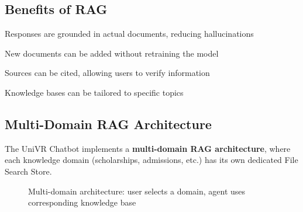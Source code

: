 \documentclass[12pt,a4paper]{article}
\begin{document}
\subsection{Benefits of RAG}

\begin{tcolorbox}[colback=univrbg, colframe=darkblue]
    \begin{description}[style=nextline]
        \item[Accuracy] Responses are grounded in actual documents, reducing hallucinations
        \item[Up-to-date Information] New documents can be added without retraining the model
        \item[Transparency] Sources can be cited, allowing users to verify information
        \item[Domain Specificity] Knowledge bases can be tailored to specific topics
    \end{description}
\end{tcolorbox}

\subsection{Multi-Domain RAG Architecture}

The UniVR Chatbot implements a \textbf{multi-domain RAG architecture}, where each knowledge domain (scholarships, admissions, etc.) has its own dedicated File Search Store.

\begin{figure}[H]
    \centering
    \caption{Multi-domain architecture: user selects a domain, agent uses corresponding knowledge base}
    \label{fig:multidomain}
\end{figure}
\end{document}
